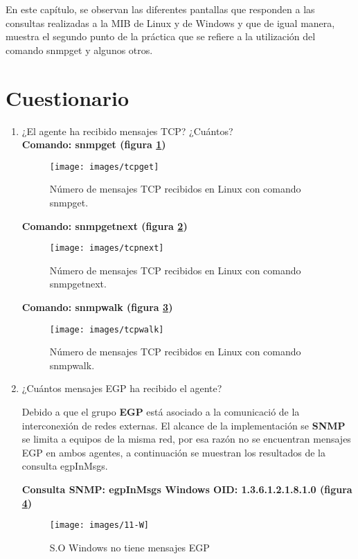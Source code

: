 En este capítulo, se observan las diferentes pantallas que responden a las consultas realizadas a la MIB de Linux y de Windows y que de igual manera, muestra el segundo punto de la práctica que se refiere a la utilización del comando snmpget y algunos otros.
\section{Cuestionario}
\begin{enumerate}


\item ¿El agente ha recibido mensajes TCP? ¿Cuántos?\\
\textbf{Comando: snmpget (figura \ref{image:tcpget})}
\FloatBarrier
\begin{figure}[htbp!]
		\centering
	\texttt{[image: images/tcpget]}
		\caption{Número de mensajes TCP recibidos en Linux con comando snmpget.}		\label{image:tcpget}
\end{figure}
\FloatBarrier

\textbf{Comando: snmpgetnext (figura \ref{image:tcpnext})}
\FloatBarrier
\begin{figure}[htbp!]
		\centering
	\texttt{[image: images/tcpnext]}
		\caption{Número de mensajes TCP recibidos en Linux con comando snmpgetnext.}		\label{image:tcpnext}
\end{figure}
\FloatBarrier

\textbf{Comando: snmpwalk (figura \ref{image:tcpwalk})}
\FloatBarrier
\begin{figure}[htbp!]
		\centering
	\texttt{[image: images/tcpwalk]}
		\caption{Número de mensajes TCP recibidos en Linux con comando snmpwalk.}		\label{image:tcpwalk}
\end{figure}
\FloatBarrier
\item ¿Cuántos mensajes EGP ha recibido el agente?

Debido a que el grupo  \textbf{EGP} está asociado a la comunicació de la interconexión de redes externas. El alcance de la implementación se  \textbf{SNMP} se limita a equipos de la misma red, por esa razón no se encuentran mensajes EGP en ambos agentes, a continuación se muestran los resultados de la consulta egpInMsgs.


\textbf{Consulta SNMP: egpInMsgs Windows OID: 1.3.6.1.2.1.8.1.0 (figura \ref{image:11-W})}
\FloatBarrier
\begin{figure}[htbp!]
		\centering
	\texttt{[image: images/11-W]}
		\caption{S.O Windows no tiene mensajes EGP}		\label{image:11-W}
\end{figure}
\FloatBarrier



\end{enumerate}
